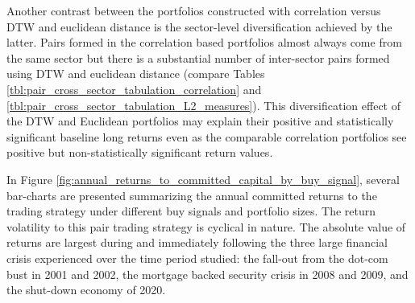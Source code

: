 \documentclass[12pt]{report}
\begin{document}
Another contrast between the portfolios constructed with correlation versus DTW and euclidean distance is the sector-level diversification achieved by the latter. Pairs formed in the correlation based portfolios almost always come from the same sector but there is a substantial number of inter-sector pairs formed using DTW and euclidean distance (compare Tables  \ref{tbl:pair_cross_sector_tabulation_correlation} and \ref{tbl:pair_cross_sector_tabulation_L2_measures}). This diversification effect of the DTW and Euclidean portfolios may explain their positive and statistically significant baseline long returns even as the comparable correlation portfolios see positive but non-statistically significant return values. 

In Figure \ref{fig:annual_returns_to_committed_capital_by_buy_signal}, several bar-charts are presented summarizing the annual committed returns to the trading strategy under different buy signals and portfolio sizes. The return volatility to this pair trading strategy is cyclical in nature. The absolute value of returns are largest during and immediately following the three large financial crisis experienced over the time period studied: the fall-out from the dot-com bust in 2001 and 2002, the mortgage backed security crisis in 2008 and 2009, and the shut-down economy of 2020.
\end{document}
